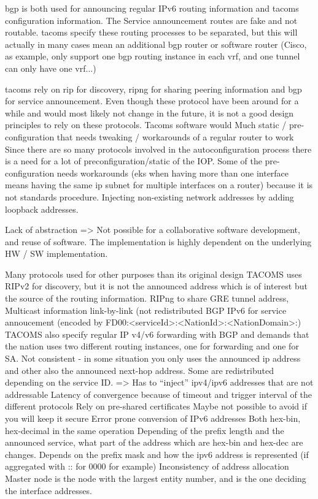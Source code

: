 \gls{bgp} is both used for announcing regular IPv6 routing information and \gls{tacoms} configuration information. The Service announcement routes are fake and not routable. \gls{tacoms} specify these routing processes to be separated, but this will actually in many cases mean an additional bgp router or software router (Cisco, as example, only support one bgp routing instance in each \gls{vrf}, and one tunnel can only have one \gls{vrf}...) %

\gls{tacoms} rely on \gls{rip} for discovery, \gls{ripng} for sharing peering information and \gls{bgp} for service announcement. Even though these protocol have been around for a while and would most likely not change in the future, it is not a good design principles to rely on these protocols.
Tacoms software would
Much static / pre-configuration that needs tweaking / workarounds of a regular router to work
Since there are so many protocols involved in the autoconfiguration process there is a need for a lot of preconfiguration/static of the IOP.
Some of the pre-configuration needs workarounds (eks when having more than one interface means having the same ip subnet for multiple interfaces on a router) because it is not standards procedure.
Injecting non-existing network addresses by adding loopback addresses. 

Lack of abstraction => Not possible for a collaborative software development, and reuse of software. 
The implementation is highly dependent on the underlying HW / SW implementation. 

Many protocols used for other purposes than its original design
TACOMS uses RIPv2 for discovery, but it is not the announced address which is of interest but the source of the routing information. 
RIPng to share GRE tunnel address, Multicast information
link-by-link (not redistributed
BGP IPv6 for service annoucement (encoded by FD00:<serviceId>:<NationId>:<NationDomain>:)
TACOMS also specify regular IP v4/v6 forwarding with BGP and demands that the nation uses two different routing instances, one for forwarding and one for SA.
Not consistent - in some situation you only uses the announced ip address and other also the announced next-hop address.
Some are redistributed depending on the service ID.
=> Has to “inject” ipv4/ipv6 addresses that are not addressable
Latency of convergence because of timeout and trigger interval of the different protocols
Rely on pre-shared certificates
Maybe not possible to avoid if you will keep it secure
Error prone conversion of IPv6 addresses 
Both hex-bin, hex-decimal in the same operation
Depending of the prefix length and the announced service, what part of the address which are hex-bin and hex-dec are changes. 
Depends on the prefix mask and how the ipv6 address is represented (if aggregated with :: for 0000 for example)
Inconsistency of address allocation
Master node is the node with the largest entity number, and is the one deciding the interface addresses. 
